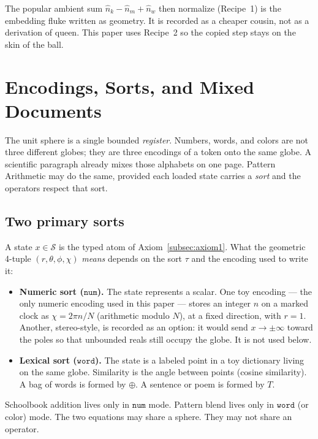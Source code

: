 \documentclass[12pt, a4paper]{article}
\begin{document}
The popular ambient sum $\hat n_k-\hat n_m+\hat n_w$ then
normalize (Recipe~1) is the embedding fluke written as geometry.
It is recorded as a cheaper cousin, not as a derivation of
$\mathrm{queen}$. This paper uses Recipe~2 so the copied step
stays on the skin of the ball.

\section{Encodings, Sorts, and Mixed Documents}
\label{sec:encodings_sorts}

The unit sphere is a single bounded \emph{register}.
Numbers, words, and colors are not three different globes; they are
three encodings of a token onto the same globe. A scientific paragraph
already mixes those alphabets on one page. Pattern Arithmetic may do
the same, provided each loaded state carries a \emph{sort} and the
operators respect that sort.

\subsection{Two primary sorts}
\label{subsec:sorts}
A state $x\in\mathcal{S}$ is the typed atom of
Axiom~\ref{subsec:axiom1}. What the geometric 4-tuple
$(r,\theta,\phi,\chi)$ \emph{means} depends on the sort $\tau$ and the
encoding used to write it:
\begin{itemize}
    \item \textbf{Numeric sort ($\mathtt{num}$).}
          The state represents a scalar. One toy encoding --- the only
          numeric encoding used in this paper --- stores an
          integer $n$ on a marked clock as
          $\chi = 2\pi n/N$ (arithmetic modulo $N$), at a fixed
          direction, with $r=1$.
          Another, stereo-style, is recorded as an option: it would
          send $x\to\pm\infty$ toward the
          poles so that unbounded reals still occupy the globe. It is
          not used below.
    \item \textbf{Lexical sort ($\mathtt{word}$).}
          The state is a labeled point in a toy dictionary living on
          the same globe. Similarity is the angle between points
          (cosine similarity). A bag of words is formed by $\oplus$.
          A sentence or poem is formed by $T$.
\end{itemize}
Schoolbook addition lives only in $\mathtt{num}$ mode.
Pattern blend lives only in $\mathtt{word}$ (or color) mode.
The two equations may share a sphere. They may not share an operator.
\end{document}
